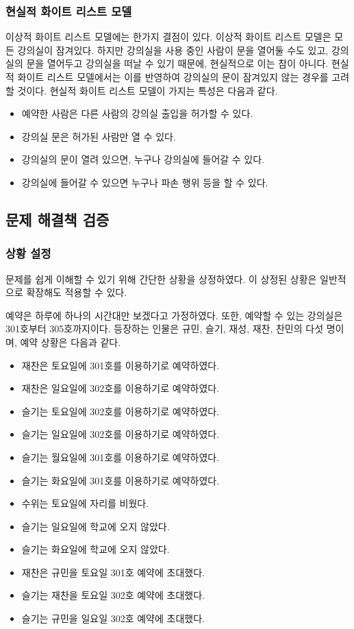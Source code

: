 \documentclass[11pt,a4paper]{article}
\begin{document}
\subsubsection{현실적 화이트 리스트 모델}
이상적 화이트 리스트 모델에는 한가지 결점이 있다. 이상적 화이트 리스트 모델은
모든 강의실이 잠겨있다. 하지만 강의실을 사용 중인 사람이 문을 열어둘 수도 있고,
강의실의 문을 열어두고 강의실을 떠날 수 있기 때문에, 현실적으로 이는 참이
아니다. 현실적 화이트 리스트 모델에서는 이를 반영하여 강의실의 문이 잠겨있지 않는
경우를 고려할 것이다. 현실적 화이트 리스트 모델이 가지는 특성은 다음과 같다.
\begin{itemize}
\item 예약한 사람은 다른 사람의 강의실 출입을 허가할 수 있다.
\item 강의실 문은 허가된 사람만 열 수 있다.
\item 강의실의 문이 열려 있으면, 누구나 강의실에 들어갈 수 있다.
\item 강의실에 들어갈 수 있으면 누구나 파손 행위 등을 할 수 있다.
\end{itemize}

\subsection{문제 해결책 검증}

\subsubsection{상황 설정}
문제를 쉽게 이해할 수 있기 위해 간단한 상황을 상정하였다. 이 상정된 상황은
일반적으로 확장해도 적용할 수 있다.

예약은 하루에 하나의 시간대만 보겠다고 가정하였다. 또한, 예약할 수 있는
강의실은 301호부터 305호까지이다. 등장하는 인물은 규민, 슬기, 재성, 재찬,
찬민의 다섯 명이며, 예약 상황은 다음과 같다.

\begin{itemize}
\item 재찬은 토요일에 301호를 이용하기로 예약하였다.
\item 재찬은 일요일에 302호를 이용하기로 예약하였다.
\item 슬기는 토요일에 302호를 이용하기로 예약하였다.
\item 슬기는 일요일에 302호를 이용하기로 예약하였다.
\item 슬기는 월요일에 301호를 이용하기로 예약하였다.
\item 슬기는 화요일에 301호를 이용하기로 예약하였다.
\item 수위는 토요일에 자리를 비웠다.
\item 슬기는 일요일에 학교에 오지 않았다.
\item 슬기는 화요일에 학교에 오지 않았다.
\item 재찬은 규민을 토요일 301호 예약에 초대했다.
\item 슬기는 재찬을 토요일 302호 예약에 초대했다.
\item 슬기는 규민을 일요일 302호 예약에 초대했다.
\end{itemize}
\end{document}
